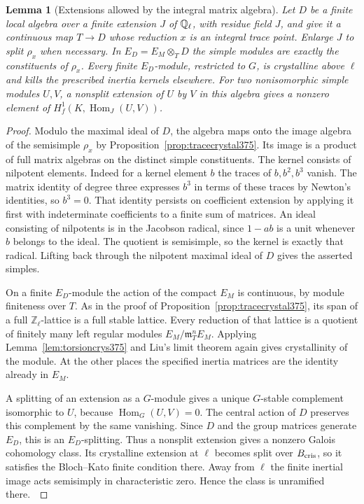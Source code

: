 \documentclass[a4paper,11pt]{article}
\newtheorem{lemma}[proposition]{Lemma}
\theoremstyle{definition}
\theoremstyle{remark}
\newcommand{\ZZ}{\mathbb Z}\newcommand{\ord}{\operatorname{ord}}
\numberwithin{equation}{section}
\begin{document}
\begin{lemma}[Extensions allowed by the integral matrix algebra]
\label{lem:matrixmodules376}
Let \(D\) be a finite local algebra over a finite extension
\(J\) of \(\mathbb Q_\ell\), with residue field \(J\), and give it
a continuous map \(T\to D\) whose reduction \(x\) is an
integral trace point. Enlarge \(J\) to split \(\rho_x\) when
necessary. In \(E_D=E_M\otimes_T D\) the simple modules are
exactly the constituents of \(\rho_x\). Every finite
\(E_D\)-module, restricted to \(G\), is crystalline above
\(\ell\) and kills the prescribed inertia kernels elsewhere.
For two nonisomorphic simple modules \(U,V\), a nonsplit
extension of \(U\) by \(V\) in this algebra gives a nonzero
element of \(H_f^1(K,\operatorname{Hom}_J(U,V))\).
\end{lemma}
\begin{proof}
Modulo the maximal ideal of \(D\), the algebra maps onto
the image algebra of the semisimple \(\rho_x\) by
Proposition~\ref{prop:tracecrystal375}. Its image is a product
of full matrix algebras on the distinct simple constituents.
The kernel consists of nilpotent elements. Indeed for a
kernel element \(b\) the traces of \(b,b^2,b^3\) vanish.
The matrix identity of degree three expresses \(b^3\) in
terms of these traces by Newton's identities, so \(b^3=0\).
That identity persists on coefficient extension by applying
it first with indeterminate coefficients to a finite sum of
matrices. An ideal consisting of nilpotents is in the
Jacobson radical, since \(1-ab\) is a unit whenever \(b\)
belongs to the ideal. The quotient is semisimple, so the
kernel is exactly that radical. Lifting back through the
nilpotent maximal ideal of \(D\) gives the asserted simples.

On a finite \(E_D\)-module the action of the compact \(E_M\)
is continuous, by module finiteness over \(T\). As in the
proof of Proposition~\ref{prop:tracecrystal375}, its span of
a full \(\ZZ_\ell\)-lattice is a full stable lattice. Every
reduction of that lattice is a quotient of finitely many
left regular modules \(E_M/\mathfrak m_T^nE_M\). Applying
Lemma~\ref{lem:torsioncrys375} and Liu's limit theorem again
gives crystallinity of the module. At the other places the
specified inertia matrices are the identity already in \(E_M\).

A splitting of an extension as a \(G\)-module gives a unique
\(G\)-stable complement isomorphic to \(U\), because
\(\operatorname{Hom}_G(U,V)=0\). The central action of \(D\)
preserves this complement by the same vanishing. Since \(D\)
and the group matrices generate \(E_D\), this is an
\(E_D\)-splitting. Thus a nonsplit extension gives a nonzero
Galois cohomology class. Its crystalline extension at
\(\ell\) becomes split over \(B_{\rm cris}\), so it satisfies
the Bloch--Kato finite condition there. Away from \(\ell\)
the finite inertial image acts semisimply in characteristic
zero. Hence the class is unramified there.~\cite{VII-V-liu375,VII-V-VI-bk117}
\end{proof}
\end{document}
